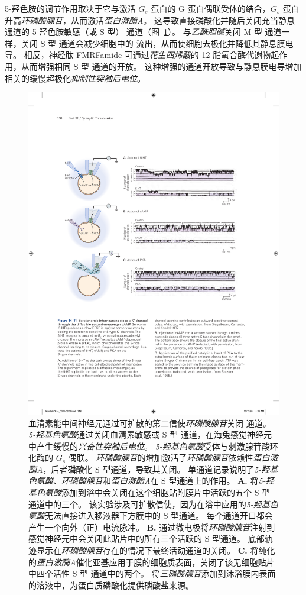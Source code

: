 5-羟色胺的调节作用取决于它与激活 $ G_s $ 蛋白的 G 蛋白偶联受体的结合，$ G_s $ 蛋白升高\textit{环磷酸腺苷}，从而激活\textit{蛋白激酶A}。
这导致直接磷酸化并随后关闭充当静息通道的 5-羟色胺敏感（或 S 型） 通道（图~\ref{fig:14_11}）。
与\textit{乙酰胆碱}关闭 M 型  通道一样，关闭 S 型  通道会减少细胞中的  流出，从而使细胞去极化并降低其静息膜电导。
相反，神经肽 FMRFamide 可通过\textit{花生四烯酸}的 12-脂氧合酶代谢物起作用，从而增强相同 S 型  通道的开放。
这种增强的通道开放导致与静息膜电导增加相关的缓慢超极化\textit{抑制性突触后电位}。


\begin{figure}[htbp]
	\centering
	\includegraphics[width=0.85\linewidth]{chap14/fig_14_11}
	\caption{血清素能中间神经元通过可扩散的第二信使\textit{环磷酸腺苷}关闭  通道。
		\textit{5-羟基色氨酸}通过关闭血清素敏感或 S 型 通道，在海兔感觉神经元中产生缓慢的\textit{兴奋性突触后电位}。
		\textit{5-羟基色氨酸}受体与刺激腺苷酸环化酶的 $ G_s $ 偶联。
		\textit{环磷酸腺苷}的增加激活了\textit{环磷酸腺苷}依赖性\textit{蛋白激酶A}，后者磷酸化 S 型通道，导致其关闭。
		单通道记录说明了\textit{5-羟基色氨酸}、\textit{环磷酸腺苷}和\textit{蛋白激酶A}在 S 型通道上的作用。
		\textbf{A. }将\textit{5-羟基色氨酸}添加到浴中会关闭在这个细胞贴附膜片中活跃的五个 S 型  通道中的三个。
		该实验涉及可扩散信使，因为在浴中应用的\textit{5-羟基色氨酸}无法直接进入移液器下方膜中的 S 型通道。
		每个通道开口都会产生一个向外（正）电流脉冲\cite{siegelbaum1982serotonin}。
		\textbf{B.} 通过微电极将\textit{环磷酸腺苷}注射到感觉神经元中会关闭此贴片中的所有三个活跃的 S 型通道。
		底部轨迹显示在\textit{环磷酸腺苷}存在的情况下最终活动通道的关闭\cite{siegelbaum1982serotonin}。
		\textbf{C.} 将纯化的\textit{蛋白激酶A}催化亚基应用于膜的细胞质表面，关闭了该无细胞贴片中四个活性 S 型  通道中的两个。
		将\textit{三磷酸腺苷}添加到沐浴膜内表面的溶液中，为蛋白质磷酸化提供磷酸盐来源\cite{shuster1985cyclic}。}
	\label{fig:14_11}
\end{figure}


